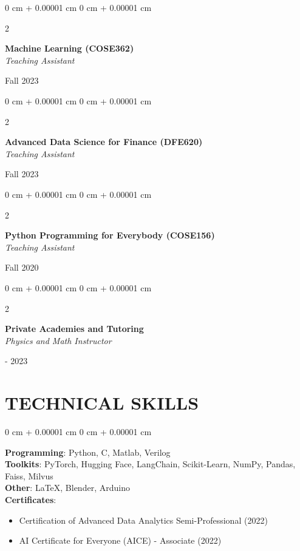 \documentclass[10pt, letterpaper]{article}
\newenvironment{highlights}{
    \begin{itemize}[
        topsep=0.10 cm,
        parsep=0.10 cm,
        partopsep=0pt,
        itemsep=0pt,
        leftmargin=0 cm + 10pt
    ]
}{
    \end{itemize}
} %
\newenvironment{onecolentry}{
    \begin{adjustwidth}{
        0 cm + 0.00001 cm
    }{
        0 cm + 0.00001 cm
    }
}{
    \end{adjustwidth}
} %
\newenvironment{twocolentry}[2][]{
    \onecolentry
    \def\secondColumn{#2}
    \setcolumnwidth{\fill, 3.5 cm}
    \begin{paracol}{2}
}{
    \switchcolumn \raggedleft \secondColumn
    \end{paracol}
    \endonecolentry
} %
\begin{document}
        \begin{twocolentry}{
            Fall 2023\\ 
        }
        \textbf{Machine Learning (COSE362)} \\
        \textit{Teaching Assistant}
        \end{twocolentry}
        \vspace{0.1 cm}

        \begin{twocolentry}{
            Fall 2023\\ 
        }
        \textbf{Advanced Data Science for Finance (DFE620)} \\
        \textit{Teaching Assistant}
        \end{twocolentry}
        \vspace{0.1 cm}

        \begin{twocolentry}{
            Fall 2020\\ 
        }
        \textbf{Python Programming for Everybody (COSE156)} \\
        \textit{Teaching Assistant}
        \end{twocolentry}
        \vspace{0.1 cm}
        
        \begin{twocolentry}{
            2016 - 2023\\
        }
        \textbf{Private Academies and Tutoring} \\
        \textit{Physics and Math Instructor}
        \end{twocolentry}
    \vspace{0.1 cm}


\section{TECHNICAL SKILLS}
        \begin{onecolentry}
        \textbf{Programming}: Python, C, Matlab, Verilog \\ 
        \vspace{0.05 cm}
        \textbf{Toolkits}: PyTorch, Hugging Face, LangChain, Scikit-Learn, NumPy, Pandas, Faiss, Milvus \\ 
        \vspace{0.05cm}
        \textbf{Other}: \LaTeX, Blender, Arduino \\
        \vspace{0.05cm}
        \textbf{Certificates}:
        \vspace{-0.1 cm}
            \begin{highlights}
                \item Certification of Advanced Data Analytics Semi-Professional (2022)
                \vspace{-0.1 cm}
                \item AI Certificate for Everyone (AICE) - Associate (2022)
            \end{highlights}
        \end{onecolentry}
            \vspace{0.1 cm}
\end{document}
